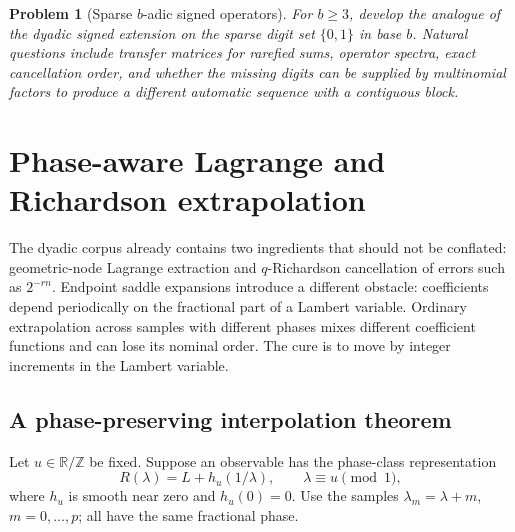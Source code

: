 \documentclass[11pt,oneside]{article}
\newtheorem{problem}[theorem]{Problem}
\theoremstyle{definition}
\theoremstyle{remark}
\newcommand{\R}{\mathbb R}
\newcommand{\Z}{\mathbb Z}
\begin{document}
\begin{problem}[Sparse $b$-adic signed operators]
For $b\ge3$, develop the analogue of the dyadic signed extension on the sparse digit set
$\{0,1\}$ in base $b$.  Natural questions include transfer matrices for rarefied sums,
operator spectra, exact cancellation order, and whether the missing digits can be supplied by
multinomial factors to produce a different automatic sequence with a contiguous block.
\end{problem}

\section{Phase-aware Lagrange and Richardson extrapolation}
\label{sec:phase}

The dyadic corpus already contains two ingredients that should not be conflated:
geometric-node Lagrange extraction and $q$-Richardson cancellation of errors such as
$2^{-rn}$.  Endpoint saddle expansions introduce a different obstacle: coefficients depend
periodically on the fractional part of a Lambert variable.  Ordinary extrapolation across
samples with different phases mixes different coefficient functions and can lose its nominal
order.  The cure is to move by integer increments in the Lambert variable.

\subsection{A phase-preserving interpolation theorem}

Let $u\in\R/\Z$ be fixed.  Suppose an observable has the phase-class representation
\begin{equation}
 R(\lambda)=L+h_u(1/\lambda),
 \qquad \lambda\equiv u\pmod1,                               \label{eq:phase-model}
\end{equation}
where $h_u$ is smooth near zero and $h_u(0)=0$.  Use the samples
$\lambda_m=\lambda+m$, $m=0,\ldots,p$; all have the same fractional phase.
\end{document}

